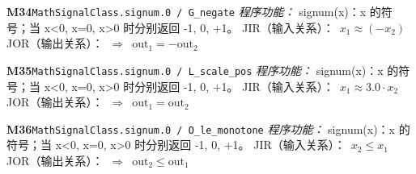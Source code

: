 \documentclass[11pt]{article}
\begin{document}
\textbf{M34}\quad \texttt{MathSignalClass.signum.0 / G\_negate}\newline
\hspace*{1.5em}\emph{程序功能：} signum(x)：x 的符号；当 x\textless{}0, x=0, x\textgreater{}0 时分别返回 -1, 0, +1。\newline
\hspace*{1.5em}JIR（输入关系）：\ $x_{1} \approx  (-x_{2})$\newline
\hspace*{1.5em}JOR（输出关系）：\ $\Rightarrow$\ $\mathrm{out}_{1} = - \mathrm{out}_{2}$\par\medskip
\textbf{M35}\quad \texttt{MathSignalClass.signum.0 / L\_scale\_pos}\newline
\hspace*{1.5em}\emph{程序功能：} signum(x)：x 的符号；当 x\textless{}0, x=0, x\textgreater{}0 时分别返回 -1, 0, +1。\newline
\hspace*{1.5em}JIR（输入关系）：\ $x_{1} \approx  3.0\cdot x_{2}$\newline
\hspace*{1.5em}JOR（输出关系）：\ $\Rightarrow$\ $\mathrm{out}_{1} = \mathrm{out}_{2}$\par\medskip
\textbf{M36}\quad \texttt{MathSignalClass.signum.0 / O\_le\_monotone}\newline
\hspace*{1.5em}\emph{程序功能：} signum(x)：x 的符号；当 x\textless{}0, x=0, x\textgreater{}0 时分别返回 -1, 0, +1。\newline
\hspace*{1.5em}JIR（输入关系）：\ $x_{2}\leq x_{1}$\newline
\hspace*{1.5em}JOR（输出关系）：\ $\Rightarrow$\ $\mathrm{out}_{2}\leq \mathrm{out}_{1}$\par\medskip
\end{document}
